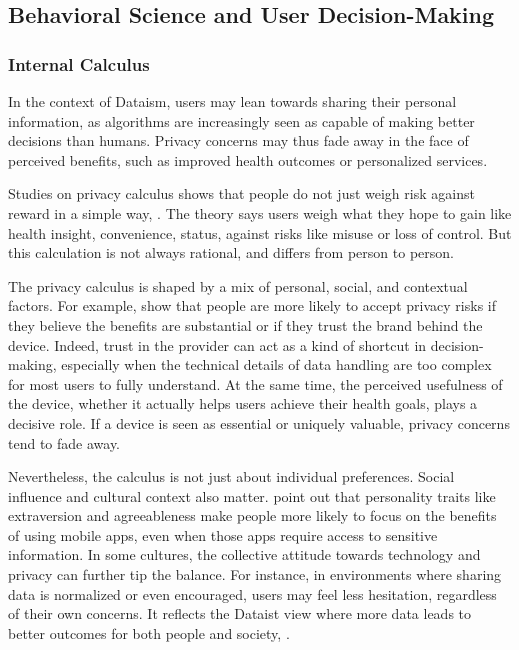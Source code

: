 \subsection{Behavioral Science and User Decision-Making}
	\subsubsection{Internal Calculus}

	In the context of Dataism, users may lean towards sharing their personal information, as algorithms are increasingly seen as capable of making better decisions than humans. Privacy concerns may thus fade away in the face of perceived benefits, such as improved health outcomes or personalized services. 

	Studies on privacy calculus shows that people do not just weigh risk against reward in a simple way, \cite{Li2016}. The theory says users weigh what they hope to gain like health insight, convenience, status, against risks like misuse or loss of control. But this calculation is not always rational, and differs from person to person.

	The privacy calculus is shaped by a mix of personal, social, and contextual factors. For example, \cite{Li2016} show that people are more likely to accept privacy risks if they believe the benefits are substantial or if they trust the brand behind the device. Indeed, trust in the provider can act as a kind of shortcut in decision-making, especially when the technical details of data handling are too complex for most users to fully understand. At the same time, the perceived usefulness of the device, whether it actually helps users achieve their health goals, plays a decisive role. If a device is seen as essential or uniquely valuable, privacy concerns tend to fade away.

	Nevertheless, the calculus is not just about individual preferences. Social influence and cultural context also matter. \cite{Pentina2016} point out that personality traits like extraversion and agreeableness make people more likely to focus on the benefits of using mobile apps, even when those apps require access to sensitive information. In some cultures, the collective attitude towards technology and privacy can further tip the balance. For instance, in environments where sharing data is normalized or even encouraged, users may feel less hesitation, regardless of their own concerns. It reflects the Dataist view where more data leads to better outcomes for both people and society, \cite{Harari2017}.

